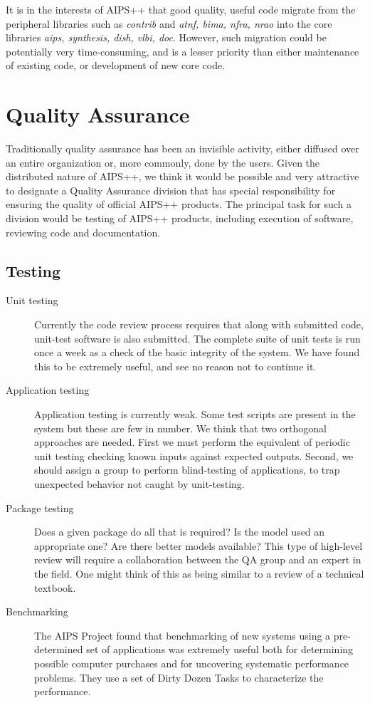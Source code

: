 It is in the interests of AIPS++ that good quality, useful code
migrate from the peripheral libraries such as {\em contrib} and {\em
atnf, bima, nfra, nrao} into the core libraries {\em aips, synthesis,
dish, vlbi, doc}. However, such migration could be potentially very
time-consuming, and is a lesser priority than either maintenance
of existing code, or development of new core code.

\section{Quality Assurance}

Traditionally quality assurance has been an invisible activity, either
diffused over an entire organization or, more commonly, done by the
users. Given the distributed nature of AIPS++, we think it would be
possible and very attractive to designate a Quality Assurance division
that has special responsibility for ensuring the quality of official
AIPS++ products. The principal task for such a division would be
testing of AIPS++ products, including execution of software, reviewing
code and documentation.

\subsection{Testing}
\begin{description}
\item[Unit testing] Currently the code review process requires that
along with submitted code, unit-test software is also submitted.
The complete suite of unit tests is run once a week
as a check of the basic integrity of the system. We have found this 
to be extremely useful, and see no reason not to continue it.
\item[Application testing] Application testing is currently
weak. Some test scripts are present in the system but these are few in
number. We think that two orthogonal approaches are needed. First we
must perform the equivalent of periodic unit testing checking
known inputs against expected outputs. Second, we
should assign a group to perform blind-testing of applications,
to trap unexpected behavior not caught by unit-testing.
\item[Package testing] Does a given package do all that is
required? Is the model used an appropriate one? Are there
better models available? This type of high-level review will
require a collaboration between the QA group and an expert in
the field. One might think of this as being similar to a review
of a technical textbook.
\item[Benchmarking] The AIPS Project found that benchmarking of
new systems using a pre-determined set of applications was
extremely useful both for determining possible computer purchases
and for uncovering systematic performance problems. They use a 
set of Dirty Dozen Tasks to characterize the performance.
\end{description}

